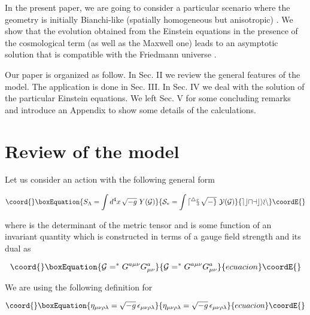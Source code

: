 \documentclass[a4paper,twocolumn,prd,superscriptaddress,nofootinbib,showpacs]
{revtex4}
\begin{document}
\medskip
In the present paper, we are going to consider a particular scenario
where the geometry is initially Bianchi-like (spatially homogeneous
but anisotropic) \cite{Belinsky}. We show that the evolution obtained
from the Einstein equations in the presence of the cosmological term
(as well as the Maxwell one) leads to an asymptotic solution that is
compatible with the Friedmann universe \cite{Weinberg,Novello2}.

\medskip
Our paper is organized as follow. In Sec. II we review the general
features of the model. The application is done in Sec. III. In Sec. IV
we deal with the solution of the particular Einstein equations. We
left Sec. V for some concluding remarks and introduce an Appendix to
show some details of the calculations.

\section{Review of the model}
\renewcommand{\theequation}{2.\arabic{equation}}
\setcounter{equation}{0}

Let us consider an action with the following general form
\cite{Novello}

\begin{equation}\coord{}\boxEquation{
S_\Lambda=\int d^4x\,\sqrt{-g}\,\,Y(\cal G)
\label{2.1}
}{
S_\Lambda=\int d^4x\,\sqrt{-g}\,\,Y(\cal G)
}{ecuacion}\coordE{}\end{equation}

\noindent
where \coordHE{} is the determinant of the metric tensor and \coordHE{} is some
function of an invariant quantity \coordHE{} which is constructed in
terms of a gauge field strength \coordHE{}  and its dual
\coordHE{} as

\begin{equation}\coord{}\boxEquation{
{\cal G}=^\ast G^{a\mu\nu}G^a_{\mu\nu}
\label{2.1a}
}{
{\cal G}=^\ast G^{a\mu\nu}G^a_{\mu\nu}
}{ecuacion}\coordE{}\end{equation}

\noindent
We are using the following definition for \myHighlight{$\eta_{\mu\nu\rho\lambda}$}\coordHE{}

\begin{equation}\coord{}\boxEquation{
\eta_{\mu\nu\rho\lambda}=\sqrt{-g}\,\epsilon_{\mu\nu\rho\lambda}
\label{2.2}
}{
\eta_{\mu\nu\rho\lambda}=\sqrt{-g}\,\epsilon_{\mu\nu\rho\lambda}
}{ecuacion}\coordE{}\end{equation}
\end{document}
